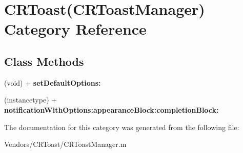 \hypertarget{category_c_r_toast_07_c_r_toast_manager_08}{}\section{C\+R\+Toast(C\+R\+Toast\+Manager) Category Reference}
\label{category_c_r_toast_07_c_r_toast_manager_08}
\subsection*{Class Methods}
\begin{DoxyCompactItemize}
\item 
\hypertarget{category_c_r_toast_07_c_r_toast_manager_08_a3d9872681adda30aefe3cc05e00f46d8}{}(void) + {\bfseries set\+Default\+Options\+:}\label{category_c_r_toast_07_c_r_toast_manager_08_a3d9872681adda30aefe3cc05e00f46d8}

\item 
\hypertarget{category_c_r_toast_07_c_r_toast_manager_08_a17134dcffcb5d2c235693b5fb1e3d043}{}(instancetype) + {\bfseries notification\+With\+Options\+:appearance\+Block\+:completion\+Block\+:}\label{category_c_r_toast_07_c_r_toast_manager_08_a17134dcffcb5d2c235693b5fb1e3d043}

\end{DoxyCompactItemize}


The documentation for this category was generated from the following file\+:\begin{DoxyCompactItemize}
\item 
Vendors/\+C\+R\+Toast/C\+R\+Toast\+Manager.\+m\end{DoxyCompactItemize}
